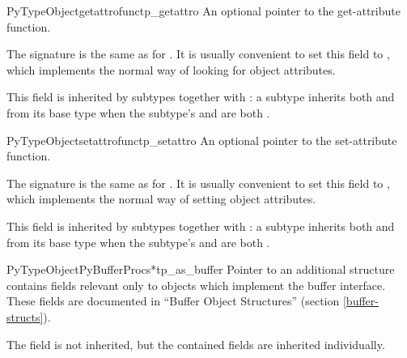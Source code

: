 \begin{cmemberdesc}{PyTypeObject}{getattrofunc}{tp_getattro}
  An optional pointer to the get-attribute function.

  The signature is the same as for .  It
  is usually convenient to set this field to
  , which implements the normal
  way of looking for object attributes.

  This field is inherited by subtypes together with
  : a subtype inherits both  and
   from its base type when the subtype's
   and  are both \NULL.
\end{cmemberdesc}

\begin{cmemberdesc}{PyTypeObject}{setattrofunc}{tp_setattro}
  An optional pointer to the set-attribute function.

  The signature is the same as for .  It
  is usually convenient to set this field to
  , which implements the normal
  way of setting object attributes.

  This field is inherited by subtypes together with
  : a subtype inherits both  and
   from its base type when the subtype's
   and  are both \NULL.
\end{cmemberdesc}

\begin{cmemberdesc}{PyTypeObject}{PyBufferProcs*}{tp_as_buffer}
  Pointer to an additional structure contains fields relevant only to
  objects which implement the buffer interface.  These fields are
  documented in ``Buffer Object Structures'' (section
  \ref{buffer-structs}).

  The  field is not inherited, but the contained
  fields are inherited individually.
\end{cmemberdesc}

